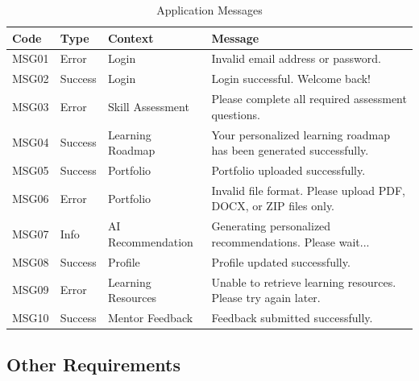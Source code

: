 \begin{table}[H]
\centering
\caption{Application Messages}
\begin{tabularx}{\textwidth}{|p{2cm}|p{2cm}|p{3.5cm}|X|}
\hline
\rowcolor{gray!20}
\textbf{Code} &
\textbf{Type} &
\textbf{Context} &
\textbf{Message} \\
\hline

MSG01 &
Error &
Login &
Invalid email address or password. \\
\hline

MSG02 &
Success &
Login &
Login successful. Welcome back! \\
\hline

MSG03 &
Error &
Skill Assessment &
Please complete all required assessment questions. \\
\hline

MSG04 &
Success &
Learning Roadmap &
Your personalized learning roadmap has been generated successfully. \\
\hline

MSG05 &
Success &
Portfolio &
Portfolio uploaded successfully. \\
\hline

MSG06 &
Error &
Portfolio &
Invalid file format. Please upload PDF, DOCX, or ZIP files only. \\
\hline

MSG07 &
Info &
AI Recommendation &
Generating personalized recommendations. Please wait... \\
\hline

MSG08 &
Success &
Profile &
Profile updated successfully. \\
\hline

MSG09 &
Error &
Learning Resources &
Unable to retrieve learning resources. Please try again later. \\
\hline

MSG10 &
Success &
Mentor Feedback &
Feedback submitted successfully. \\
\hline

\end{tabularx}
\end{table}

\subsection{Other Requirements}

